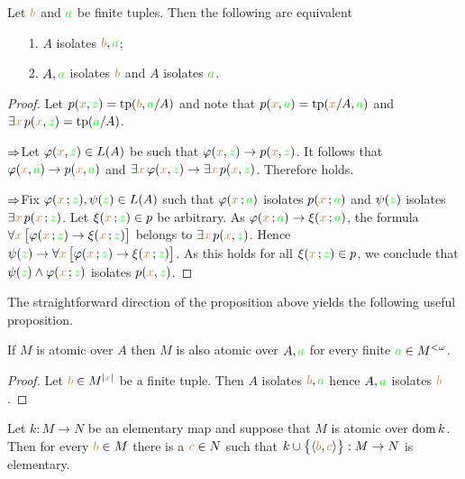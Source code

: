 \documentclass[creche.tex]{subfiles}
\begin{document}
\begin{proposition}
Let ${\color{brown} b}$ and ${\color{green} a}$ be finite tuples. Then the following are equivalent
\begin{itemize}
\item[1.] $A$ isolates  ${\color{brown} b},{\color{green} a}$;
\item[2.] $A,{\color{green} a}$ isolates ${\color{brown} b}$ and $A$ isolates ${\color{green} a}$.
\end{itemize}
\end{proposition}
\begin{proof}
Let $p({\color{brown} x},{\color{green} z})={\rm tp} ({\color{brown} b},{\color{green} a}/A)$ and note that  $p({\color{brown} x},{\color{green} a})={\rm tp}({\color{brown} x}/A,{\color{green} a})$ and $\exists{\color{brown}x}\,p({\color{brown} x},{\color{green} z})={\rm tp}({\color{green} a}/A)$. 

$\Rightarrow$\quad Let $\varphi({\color{brown} x},{\color{green} z})\in L(A)$ be such that $\varphi({\color{brown} x},{\color{green} z})\rightarrow p({\color{brown} x},{\color{green} z})$. It follows that $\varphi({\color{brown} x},{\color{green} a})\rightarrow p({\color{brown} x},{\color{green} a})$ and $\exists{\color{brown}x}\, \varphi({\color{brown} x},{\color{green} z})\rightarrow \exists{\color{brown}x}\,p({\color{brown} x},{\color{green} z})$. Therefore  holds.

$\Rightarrow$\quad Fix $\varphi({\color{brown} x}\,;{\color{green} z}), \psi({\color{green} z})\in L(A)$ such that $\varphi({\color{brown} x}\,;{\color{green} a})$ isolates $p({\color{brown} x}\,;{\color{green} a})$ and $\psi({\color{green} z})$ isolates $\exists {\color{brown}x}\, p({\color{brown} x}\,;{\color{green} z})$. Let $\xi({\color{brown} x}\,;{\color{green} z})\in p$ be arbitrary. As $\varphi({\color{brown} x}\,;{\color{green} a})\rightarrow\xi({\color{brown} x}\,;{\color{green} a})$, the formula $\forall{\color{brown}x}\,\big[\varphi({\color{brown} x}\,;{\color{green} z})\rightarrow\xi({\color{brown} x}\,;{\color{green} z})\big]$ belongs to $\exists {\color{brown}x}\, p({\color{brown} x},{\color{green} z})$. Hence $\psi({\color{green} z})\rightarrow\forall{\color{brown}x}\,\big[\varphi({\color{brown} x}\,;{\color{green} z})\rightarrow\xi({\color{brown} x}\,;{\color{green} z})\big]$. As this holds for all $\xi({\color{brown} x}\,;{\color{green} z})\in p$, we conclude that $\psi({\color{green} z})\wedge\varphi({\color{brown} x}\,;{\color{green} z})$ isolates  $p({\color{brown} x},{\color{green} z})$.
\end{proof}

The straightforward direction of the proposition above yields the following useful proposition.

\begin{proposition}\label{prop_atomic_over_Aa}
If $M$ is atomic over $A$ then $M$ is also atomic over $A,{\color{green} a}$ for every finite ${\color{green} a}\in M^{<\omega}$.
\end{proposition}
\begin{proof}
Let ${\color{brown} b}\in M^{|{\color{brown} x}|}$ be a finite tuple. Then $A$ isolates ${\color{brown} b},{\color{green} a}$  hence $A,{\color{green} a}$ isolates ${\color{brown} b}$.
\end{proof}

\begin{proposition}\label{prop_atomic_extension}
Let $k:M\to N$ be an elementary map and suppose that $M$ is atomic over $\mathop{\rm dom} k$. Then for every ${\color{brown} b}\in M$ there is a ${\color{brown} c}\in N$ such that $k\cup\big\{\langle{\color{brown}b},{\color{brown} c}\rangle\big\}:M\to N$ is elementary.
\end{proposition}
\end{document}
